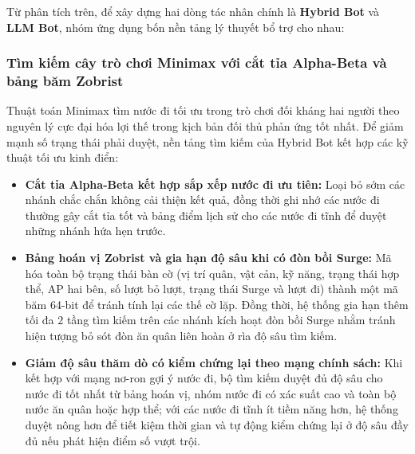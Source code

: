 Từ phân tích trên, để xây dựng hai dòng tác nhân chính là \textbf{Hybrid Bot} và \textbf{LLM Bot}, nhóm ứng dụng bốn nền tảng lý thuyết bổ trợ cho nhau:

\subsubsection{Tìm kiếm cây trò chơi Minimax với cắt tỉa Alpha-Beta và bảng băm Zobrist}
Thuật toán Minimax tìm nước đi tối ưu trong trò chơi đối kháng hai người theo nguyên lý cực đại hóa lợi thế trong kịch bản đối thủ phản ứng tốt nhất. Để giảm mạnh số trạng thái phải duyệt, nền tảng tìm kiếm của Hybrid Bot kết hợp các kỹ thuật tối ưu kinh điển:
\begin{itemize}
    \item \textbf{Cắt tỉa Alpha-Beta kết hợp sắp xếp nước đi ưu tiên:} Loại bỏ sớm các nhánh chắc chắn không cải thiện kết quả, đồng thời ghi nhớ các nước đi thường gây cắt tỉa tốt và bảng điểm lịch sử cho các nước đi tĩnh để duyệt những nhánh hứa hẹn trước.
    \item \textbf{Bảng hoán vị Zobrist và gia hạn độ sâu khi có đòn bồi Surge:} Mã hóa toàn bộ trạng thái bàn cờ (vị trí quân, vật cản, kỹ năng, trạng thái hợp thể, AP hai bên, số lượt bỏ lượt, trạng thái Surge và lượt đi) thành một mã băm 64-bit để tránh tính lại các thế cờ lặp. Đồng thời, hệ thống gia hạn thêm tối đa $2$ tầng tìm kiếm trên các nhánh kích hoạt đòn bồi Surge nhằm tránh hiện tượng bỏ sót đòn ăn quân liên hoàn ở rìa độ sâu tìm kiếm.
    \item \textbf{Giảm độ sâu thăm dò có kiểm chứng lại theo mạng chính sách:} Khi kết hợp với mạng nơ-ron gợi ý nước đi, bộ tìm kiếm duyệt đủ độ sâu cho nước đi tốt nhất từ bảng hoán vị, nhóm nước đi có xác suất cao và toàn bộ nước ăn quân hoặc hợp thể; với các nước đi tĩnh ít tiềm năng hơn, hệ thống duyệt nông hơn để tiết kiệm thời gian và tự động kiểm chứng lại ở độ sâu đầy đủ nếu phát hiện điểm số vượt trội.
\end{itemize}

